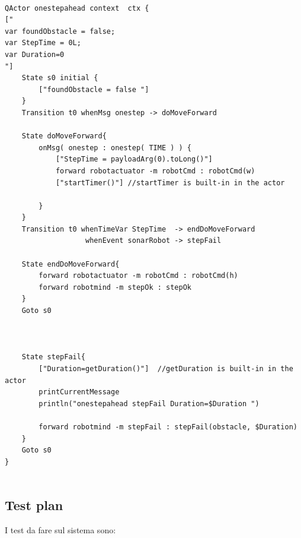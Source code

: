 \begin{lstlisting}[backgroundcolor=\color{white}, label={lst:onestepahead_ddr_sys_2}, caption={Codice di QActor onestepahead in ddrSystem2} ]

QActor onestepahead context  ctx {
[" 
var foundObstacle = false; 
var StepTime = 0L; 
var Duration=0 
"]  
	State s0 initial {	   
		["foundObstacle = false "]
	} 
	Transition t0 whenMsg onestep -> doMoveForward
 
	State doMoveForward{		 
		onMsg( onestep : onestep( TIME ) ) {
			["StepTime = payloadArg(0).toLong()"]    		
			forward robotactuator -m robotCmd : robotCmd(w)
	 		["startTimer()"] //startTimer is built-in in the actor
	 		
		}      
	}          
	Transition t0 whenTimeVar StepTime  -> endDoMoveForward		
 		           whenEvent sonarRobot -> stepFail  
 		    
	State endDoMoveForward{
		forward robotactuator -m robotCmd : robotCmd(h)
		forward robotmind -m stepOk : stepOk
	}
	Goto s0
	  

	
	State stepFail{ 
		["Duration=getDuration()"]  //getDuration is built-in in the actor
		printCurrentMessage
		println("onestepahead stepFail Duration=$Duration ")
		
		forward robotmind -m stepFail : stepFail(obstacle, $Duration)
	}
	Goto s0  
}    


\end{lstlisting}



\subsection{Test plan}
I test da fare sul sistema sono:

